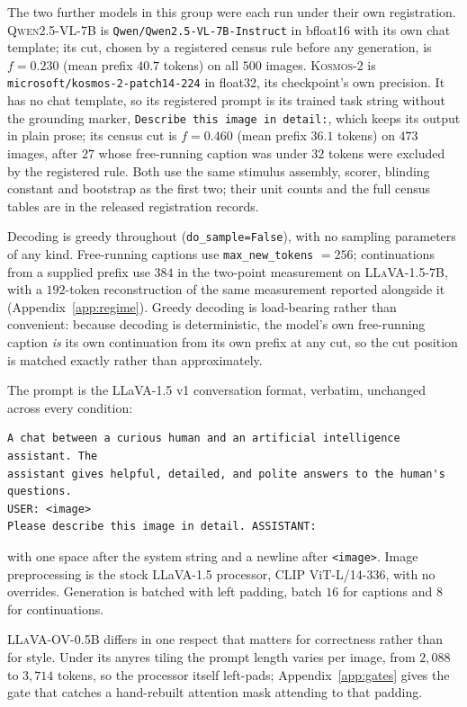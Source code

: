The two further models in this group were each run under their own registration. \textsc{Qwen2.5-VL-7B} is
\texttt{Qwen/Qwen2.5-VL-7B-Instruct} \citep{qwen25vl} in bfloat16 with its own chat template; its cut, chosen by a
registered census rule before any generation, is $f = 0.230$ (mean prefix $40.7$ tokens) on all
$500$ images. \textsc{Kosmos-2} is \texttt{microsoft/kosmos-2-patch14-224} \citep{kosmos2} in float32, its
checkpoint's own precision. It has no chat template, so its registered prompt is its trained task
string without the grounding marker, \texttt{Describe this image in detail:}, which keeps its output
in plain prose; its census cut is $f = 0.460$ (mean prefix $36.1$ tokens) on $473$ images, after $27$
whose free-running caption was under $32$ tokens were excluded by the registered rule. Both use the
same stimulus assembly, scorer, blinding constant and bootstrap as the first two; their unit counts
and the full census tables are in the released registration records.

Decoding is greedy throughout (\texttt{do\_sample=False}), with no sampling parameters of any kind.
Free-running captions use \texttt{max\_new\_tokens} $=256$; continuations from a supplied prefix use
$384$ in the two-point measurement on \textsc{LLaVA-1.5-7B}, with a $192$-token reconstruction of the
same measurement reported alongside it (Appendix~\ref{app:regime}). Greedy decoding is load-bearing rather than convenient:
because decoding is deterministic, the model's own free-running caption \emph{is} its own
continuation from its own prefix at any cut, so the cut position is matched exactly rather than
approximately.

The prompt is the LLaVA-1.5 v1 conversation format, verbatim, unchanged across every condition:

\begingroup\fontsize{8}{9.5}\selectfont\begin{verbatim}
A chat between a curious human and an artificial intelligence assistant. The
assistant gives helpful, detailed, and polite answers to the human's questions.
USER: <image>
Please describe this image in detail. ASSISTANT:
\end{verbatim}\endgroup

\noindent with one space after the system string and a newline after \texttt{<image>}. Image
preprocessing is the stock LLaVA-1.5 processor, CLIP ViT-L/14-336, with no overrides. Generation is
batched with left padding, batch $16$ for captions and $8$ for continuations.

\textsc{LLaVA-OV-0.5B} differs in one respect that matters for correctness rather than for style.
Under its anyres tiling the prompt length varies per image, from $2{,}088$ to $3{,}714$ tokens, so
the processor itself left-pads; Appendix~\ref{app:gates} gives the gate that catches a hand-rebuilt
attention mask attending to that padding.


